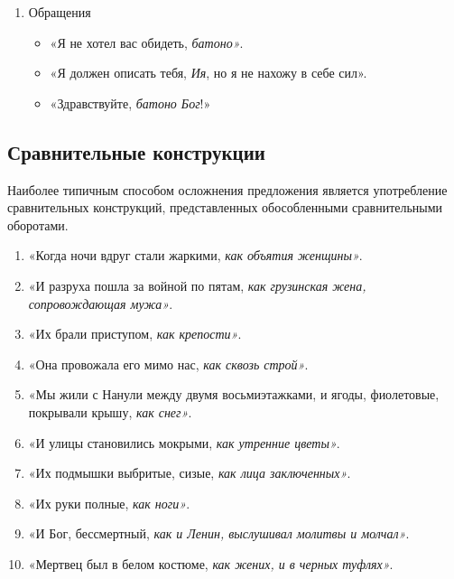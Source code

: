 \documentclass{kursa4}
\begin{document}
{\begin{enumerate}
          \item Обращения \begin{itemize}
            \item «Я не хотел вас обидеть, \textit{батоно»}. \item «Я должен описать тебя, \textit{Ия}, но я не нахожу в себе сил». \item «Здравствуйте, \textit{батоно Бог}!» \end{itemize}
        \end{enumerate}

      \subsection{Сравнительные конструкции}
      Наиболее типичным способом осложнения предложения является употребление сравнительных конструкций, представленных обособленными сравнительными оборотами. \begin{enumerate}
        \item «Когда ночи вдруг стали жаркими, \textit{как объятия женщины»}. \item «И разруха пошла за войной по пятам, \textit{как грузинская жена, сопровождающая мужа»}. \item «Их брали приступом, \textit{как крепости»}. \item «Она провожала его мимо нас, \textit{как сквозь строй»}. \item «Мы жили с Нанули между двумя восьмиэтажками, и ягоды, фиолетовые, покрывали крышу, \textit{как снег»}. \item «И улицы становились мокрыми, \textit{как утренние цветы»}. \item «Их подмышки выбритые, сизые, \textit{как лица заключенных»}. \item «Их руки полные, \textit{как ноги»}. \item «И Бог, бессмертный, \textit{как и Ленин, выслушивал молитвы и молчал»}. \item «Мертвец был в белом костюме, \textit{как жених, и в черных туфлях»}. \end{enumerate}

}
\end{document}
